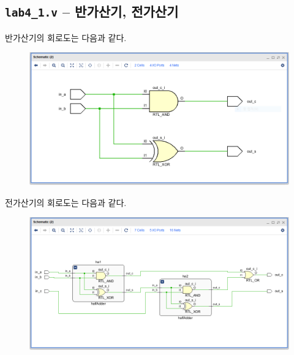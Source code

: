 \documentclass{scrartcl}
\begin{document}
\subsection{\texttt{lab4\_1.v} -- 반가산기, 전가산기}
반가산기의 회로도는 다음과 같다.
\begin{figure}[H]
  \centering
  \includegraphics[width=0.9\linewidth]{lab4_1_half_schematic.png}
\end{figure}
전가산기의 회로도는 다음과 같다.
\begin{figure}[H]
  \centering
  \includegraphics[width=0.9\linewidth]{lab4_1_full_schematic.png}
\end{figure}
\end{document}
